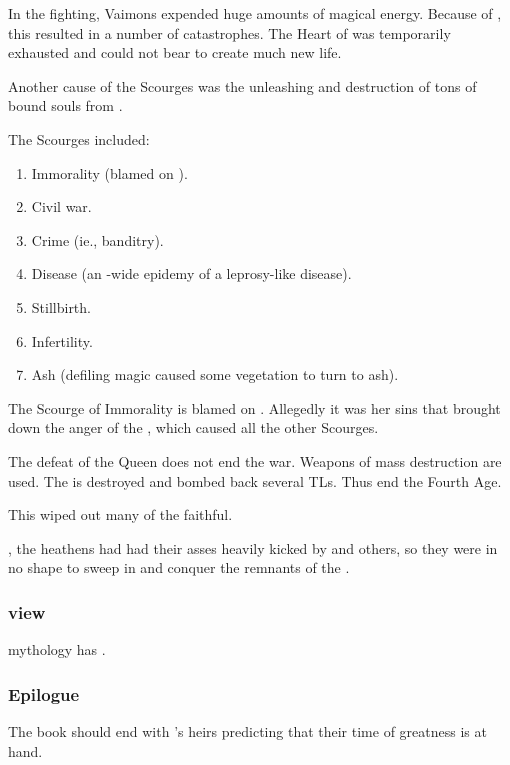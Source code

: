 In the fighting, Vaimons expended huge amounts of magical energy. 
Because of , this resulted in a number of catastrophes. 
The Heart of \Miith{} was temporarily exhausted and could not bear to create much new life. 

Another cause of the Scourges was the unleashing and destruction of tons of bound souls from . 

The Scourges included:
\begin{enumerate}
  \item Immorality (blamed on \Belzir). 
  \item Civil war. 
  \item Crime (ie., banditry).
  \item Disease (an \caliphate-wide epidemy of a leprosy-like disease). 
  \item Stillbirth. 
  \item Infertility. 
  \item Ash (defiling magic caused some vegetation to turn to ash). 
\end{enumerate}

The Scourge of Immorality is blamed on \Belzir. 
Allegedly it was her sins that brought down the anger of the \Archons, which caused all the other Scourges. 

The defeat of the Queen does not end the war. Weapons of mass destruction are used. The \caliphate is destroyed and \Miith{} bombed back several TLs. Thus end the Fourth Age. 

This wiped out many of the faithful. 

, the heathens had had their asses heavily kicked by \VizicarDurasRespina{} and others, so they were in no shape to sweep in and conquer the remnants of the \caliphate. 





\subsubsection{\Ortaican view}
\Ortaican mythology has . 





\subsubsection{Epilogue}
The book should end with 's heirs predicting that their time of greatness is at hand. 
















